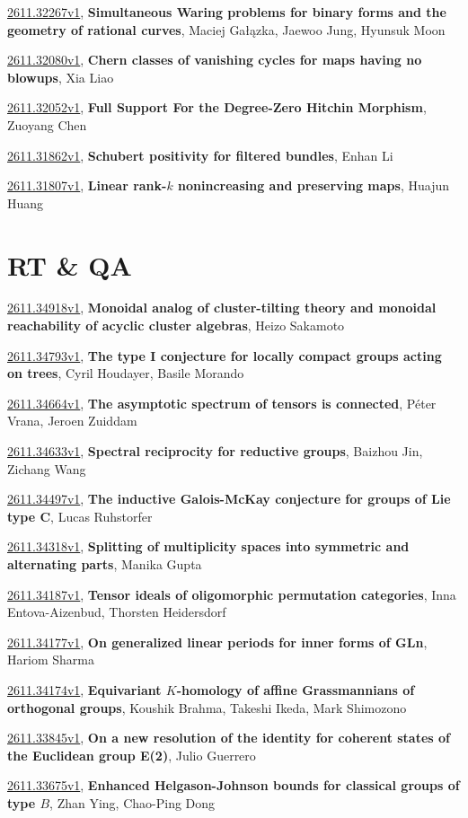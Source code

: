 \documentclass[9pt, a4paper]{article}
\theoremstyle{plain}
\theoremstyle{definition}
\theoremstyle{remark}
\newcommand{\arxiv}[3]{\href{https://arxiv.org/abs/#1}{#1}, \textbf{\textcolor{arxivblue}{#2}}, #3}
\begin{document}
\arxiv{2611.32267v1}{Simultaneous Waring problems for binary forms and the geometry of rational curves}{Maciej Gałązka, Jaewoo Jung, Hyunsuk Moon}

\arxiv{2611.32080v1}{Chern classes of vanishing cycles for maps having no blowups}{Xia Liao}

\arxiv{2611.32052v1}{Full Support For the Degree-Zero Hitchin Morphism}{Zuoyang Chen}

\arxiv{2611.31862v1}{Schubert positivity for filtered bundles}{Enhan Li}

\arxiv{2611.31807v1}{Linear rank-\(k\) nonincreasing and preserving maps}{Huajun Huang}


\section{RT \& QA}
\arxiv{2611.34918v1}{Monoidal analog of cluster-tilting theory and monoidal reachability of acyclic cluster algebras}{Heizo Sakamoto}

\arxiv{2611.34793v1}{The type I conjecture for locally compact groups acting on trees}{Cyril Houdayer, Basile Morando}

\arxiv{2611.34664v1}{The asymptotic spectrum of tensors is connected}{Péter Vrana, Jeroen Zuiddam}

\arxiv{2611.34633v1}{Spectral reciprocity for reductive groups}{Baizhou Jin, Zichang Wang}

\arxiv{2611.34497v1}{The inductive Galois-McKay conjecture for groups of Lie type C}{Lucas Ruhstorfer}

\arxiv{2611.34318v1}{Splitting of multiplicity spaces into symmetric and alternating parts}{Manika Gupta}

\arxiv{2611.34187v1}{Tensor ideals of oligomorphic permutation categories}{Inna Entova-Aizenbud, Thorsten Heidersdorf}

\arxiv{2611.34177v1}{On generalized linear periods for inner forms of GLn}{Hariom Sharma}

\arxiv{2611.34174v1}{Equivariant $K$-homology of affine Grassmannians of orthogonal groups}{Koushik Brahma, Takeshi Ikeda, Mark Shimozono}

\arxiv{2611.33845v1}{On a new resolution of the identity for coherent states of the Euclidean group E(2)}{Julio Guerrero}

\arxiv{2611.33675v1}{Enhanced Helgason-Johnson bounds for classical groups of type $B$}{Zhan Ying, Chao-Ping Dong}
\end{document}
